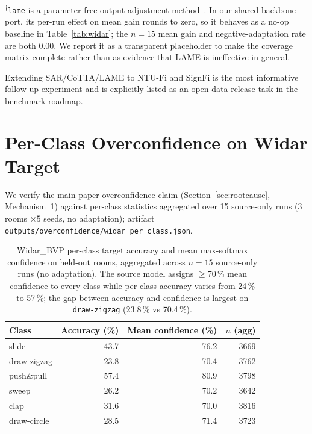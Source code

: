 \textsuperscript{$\dagger$}\texttt{lame} is a parameter-free output-adjustment method~\cite{boudiaf2022lame}. In our shared-backbone port, its per-run effect on mean gain rounds to zero, so it behaves as a no-op baseline in Table~\ref{tab:widar}; the $n{=}15$ mean gain and negative-adaptation rate are both $0.00$. We report it as a transparent placeholder to make the coverage matrix complete rather than as evidence that LAME is ineffective in general.

Extending SAR/CoTTA/LAME to NTU-Fi and SignFi is the most informative follow-up experiment and is explicitly listed as an open data release task in the benchmark roadmap.

\section{Per-Class Overconfidence on Widar Target}
\label{app:overconfidence}

We verify the main-paper overconfidence claim (Section~\ref{sec:rootcause}, Mechanism~1) against per-class statistics aggregated over 15 source-only runs ($3$ rooms $\times 5$ seeds, no adaptation); artifact \texttt{outputs/overconfidence/widar\_per\_class.json}.

\begin{table}[h]
\centering
\caption{Widar\_BVP per-class target accuracy and mean max-softmax confidence on held-out rooms, aggregated across $n{=}15$ source-only runs (no adaptation). The source model assigns $\geq$70\,\% mean confidence to every class while per-class accuracy varies from 24\,\% to 57\,\%; the gap between accuracy and confidence is largest on \texttt{draw-zigzag} (23.8\,\% vs 70.4\,\%).}
\label{tab:overconfidence}
\small
\begin{tabular}{lrrr}
\toprule
\textbf{Class} & \textbf{Accuracy (\%)} & \textbf{Mean confidence (\%)} & \textbf{$n$ (agg)} \\
\midrule
slide        & 43.7 & 76.2 & 3669 \\
draw-zigzag  & 23.8 & 70.4 & 3762 \\
push\&pull   & 57.4 & 80.9 & 3798 \\
sweep        & 26.2 & 70.2 & 3642 \\
clap         & 31.6 & 70.0 & 3816 \\
draw-circle  & 28.5 & 71.4 & 3723 \\
\bottomrule
\end{tabular}
\end{table}

